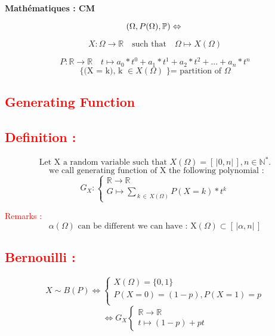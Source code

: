 \documentclass[a4paper,12pt]{article}
\begin{document}
\begin{center}
\textbf{Mathématiques : CM}
\end{center}

\[
(\Omega, P(\Omega), \mathbb{P}) \Leftrightarrow \\
\]

\bigskip
\begin{center}
\[
X : \Omega \rightarrow \mathbb{R}
\quad \text{such that} \quad
\Omega \mapsto X(\Omega)
\]
\bigskip

\[
P : \mathbb{R} \rightarrow \mathbb{R}
\quad t \mapsto a_0*t^0 + a_1 * t^1 + a_2 * t^2 +...+a_n * t^n
\]
\[
\text{\{(X = k), k } \in X(\Omega) \text{ \} = partition of }\Omega
\]

\end{center}


\begin{center}
\Large \textcolor{red}{\section*{Generating Function}}
\end{center}
\textcolor{red}{\subsection*{Definition :}} 
\[
\text{Let X a random variable such that } X(\Omega) = \left[\,|0, n|\,\right]
, n \in \mathbb{N}^*.
\]
\[
\text{ we call generating function of X the following polynomial :}
\]
\[
  G_X : \begin{cases}
    \mathbb{R} \rightarrow \mathbb{R}\\
 G \mapsto \sum_{ \, k \, \in \, X(\Omega)}{P(X = k) * t^k}
\end{cases}
\]

\textcolor{red}{Remarks :}\\

 \[\alpha(\Omega) \text{ can be different we can have : X}(\Omega) \subset \left[\,|\alpha, n|\,\right] \]
\bigskip

\textcolor{red}{\subsection*{Bernouilli :}}

\[
X \sim B(P) \Leftrightarrow
\begin{cases}
X (\Omega) = \{0,1\}\\
P(X= 0) = (1-p), P(X= 1) = p \\
\end{cases}
\]
\[
\Leftrightarrow G_X \begin{cases}
\mathbb{R} \rightarrow \mathbb{R}\\
t \mapsto (1-p) + pt
\end{cases}
\]
\end{document}
